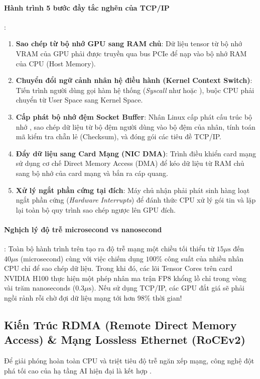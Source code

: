 \paragraph{Hành trình 5 bước đầy tắc nghẽn của TCP/IP}:
\begin{enumerate}
  \item \textbf{Sao chép từ bộ nhớ GPU sang RAM chủ}: Dữ liệu tensor từ bộ nhớ VRAM của GPU phải được truyền qua bus PCIe để nạp vào bộ nhớ RAM của CPU (Host Memory).
  \item \textbf{Chuyển đổi ngữ cảnh nhân hệ điều hành (Kernel Context Switch)}: Tiến trình người dùng gọi hàm hệ thống (\textit{Syscall} như  hoặc ), buộc CPU phải chuyển từ User Space sang Kernel Space.
  \item \textbf{Cấp phát bộ nhớ đệm Socket Buffer}: Nhân Linux cấp phát cấu trúc bộ nhớ , sao chép dữ liệu từ bộ đệm người dùng vào bộ đệm của nhân, tính toán mã kiểm tra chẵn lẻ (Checksum), và đóng gói các tiêu đề TCP/IP.
  \item \textbf{Đẩy dữ liệu sang Card Mạng (NIC DMA)}: Trình điều khiển card mạng sử dụng cơ chế Direct Memory Access (DMA) để kéo dữ liệu từ RAM chủ sang bộ nhớ của card mạng và bắn ra cáp quang.
  \item \textbf{Xử lý ngắt phần cứng tại đích}: Máy chủ nhận phải phát sinh hàng loạt ngắt phần cứng (\textit{Hardware Interrupts}) để đánh thức CPU xử lý gói tin và lặp lại toàn bộ quy trình sao chép ngược lên GPU đích.
\end{enumerate}

\paragraph{Nghịch lý độ trễ microsecond vs nanosecond}:
Toàn bộ hành trình trên tạo ra độ trễ mạng một chiều tối thiểu từ $15\mu\text{s}$ đến $40\mu\text{s}$ (microsecond) cùng với việc chiếm dụng $100\%$ công suất của nhiều nhân CPU chỉ để sao chép dữ liệu. Trong khi đó, các lõi Tensor Cores trên card NVIDIA H100 thực hiện một phép nhân ma trận FP8 khổng lồ chỉ trong vòng vài trăm nanoseconds ($0.3\mu\text{s}$). Nếu sử dụng TCP/IP, các GPU đắt giá sẽ phải ngồi rảnh rỗi chờ đợi dữ liệu mạng tới hơn $98\%$ thời gian!

\subsection{Kiến Trúc RDMA (Remote Direct Memory Access) \& Mạng Lossless Ethernet (RoCEv2)}
Để giải phóng hoàn toàn CPU và triệt tiêu độ trễ ngăn xếp mạng, công nghệ đột phá tối cao của hạ tầng AI hiện đại là  kết hợp .

